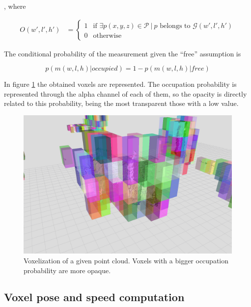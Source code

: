 , where

\begin{equation}\label{eq:cp05_occupied}
\begin{align*}
 O(w', l', h') &=
  \begin{cases}
   1        & \text{if } %
   {\exists p(x, y, z) \in \mathcal{P} ~|~ p \text{ belongs to } \mathcal{G}(w', l', h')}%
   \\
   0        & \text{otherwise}
  \end{cases}
\end{align*}
\end{equation}

The conditional probability of the measurement given the “free” assumption is

\begin{equation}\label{eq:cp05_conditional_prob}
p(m(w,l,h)|occupied) = 1 - p(m(w,l,h)|free)
\end{equation}

In figure \ref{fig:cp05_voxelization} the obtained voxels are represented. The occupation probability is represented through the alpha channel of each of them, so the opacity is directly related to this probability, being the most transparent those with a low value.

\begin{figure}[t]
  \centering
  \includegraphics{voxelization}
  \caption{Voxelization of a given point cloud. Voxels with a bigger occupation probability are more opaque.}\label{fig:cp05_voxelization}
\end{figure}

\subsection{Voxel pose and speed computation}\label{ch:chapter05_01_04}

